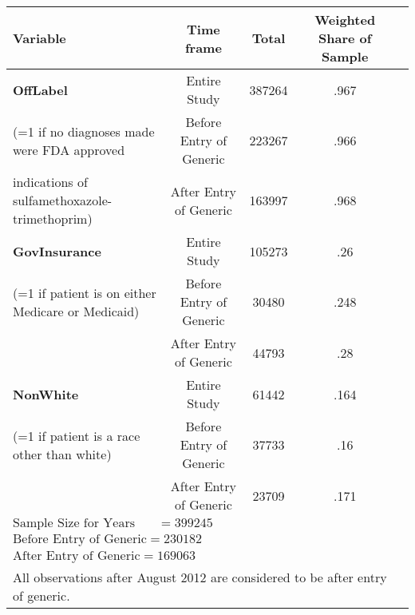 \begin{tabular}{l*{4}{c}}
\hline\hline
            Variable&\multicolumn{1}{c}{Time frame}&\multicolumn{1}{c}{Total}&\multicolumn{1}{c}{Weighted Share of Sample}\\
\hline
\textbf{OffLabel}                                                &     Entire Study&             387264&      .967\\
(=1 if no diagnoses made were FDA approved          &     Before Entry of Generic&    223267&      .966\\
indications of sulfamethoxazole-trimethoprim)  &     After Entry of Generic&      163997&      .968\\
[1em]
\textbf{GovInsurance}                                            &     Entire Study&             105273&      .26 \\
(=1 if patient is on either Medicare or Medicaid)       &     Before Entry of Generic&     30480 &      .248\\
                                                        &     After Entry of Generic&      44793 &      .28\\
[1em]
\textbf{NonWhite}                                                &     Entire Study&             61442&      .164\\
(=1 if patient is a race other than white)                &     Before Entry of Generic&     37733&      .16\\
                                                        &     After Entry of Generic&      23709&      .171\\
\hline
$\text{Sample Size for Years 2006-2016} = 399245$\\
$\text{Before Entry of Generic} = 230182$\\
$\text{After Entry of Generic} = 169063$\\
\hline\hline
\multicolumn{4}{l}{\footnotesize All observations after August 2012 are considered to be after entry of generic.}\\
\end{tabular}

